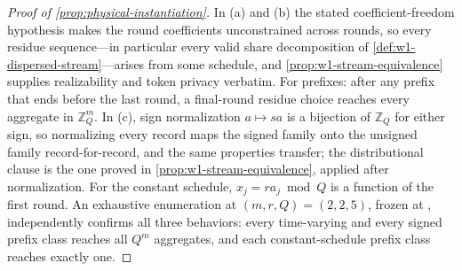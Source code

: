 \begin{proof}[Proof of \cref{prop:physical-instantiation}]
In (a) and (b) the stated coefficient-freedom hypothesis makes the round
coefficients unconstrained across rounds,
so every residue sequence---in particular every valid share
decomposition of \cref{def:w1-dispersed-stream}---arises from some
schedule, and \cref{prop:w1-stream-equivalence} supplies realizability
and token privacy verbatim.  For prefixes: after any prefix that ends
before the last round, a final-round residue choice reaches every
aggregate in $\mathbb Z_Q^m$.  In (c), sign normalization $a\mapsto sa$ is
a bijection of $\mathbb Z_Q$ for either sign, so normalizing every
record maps the signed family onto the unsigned family
record-for-record, and the same properties transfer; the distributional
clause is the one proved in \cref{prop:w1-stream-equivalence}, applied
after normalization.  For the constant schedule, $x_j=ra_j\bmod Q$ is a
function of the first round.  An exhaustive enumeration at
$(m,r,Q)=(2,2,5)$, frozen at
, independently
confirms all three behaviors: every time-varying and every signed
prefix class reaches all $Q^m$ aggregates, and each constant-schedule
prefix class reaches exactly one.
\end{proof}

